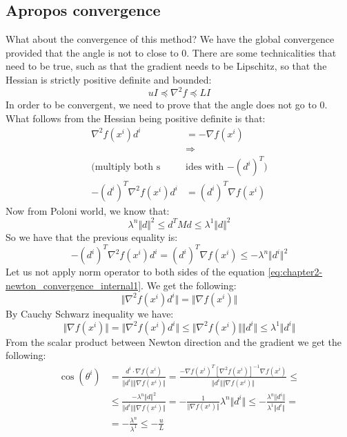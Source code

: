 \subsection{Apropos convergence}
\par What about the convergence of this method? We have the global convergence provided that the angle is not to close to 0. There are some technicalities that need to be true, such as that the gradient needs to be Lipschitz, so that the Hessian is strictly positive definite and bounded:
\begin{equation}
    u I \preceq \nabla^2 f \preceq L I
\end{equation}
In order to be convergent, we need to prove that the angle does not go to 0. What follows from the Hessian being positive definite is that:
\begin{align}
    \nabla^2 f(x^i) d^i &= - \nabla f(x^i) \label{eq:chapter2-newton_convergence_internal1}\\
    & \Rightarrow\\
    \mbox{(multiply both s}&\mbox{ides with $-(d^i)^T$)}\\
    - (d^i)^T \nabla^2 f(x^i) d^i &= (d^i)^T \nabla f(x^i)
\end{align}
Now from Poloni world, we know that:
\begin{equation}
    \lambda^n \Vert d \Vert^2 \leq d^T M d \leq \lambda^1 \Vert d \Vert^2
\end{equation}
So we have that the previous equality is:
\begin{equation}
    - (d^i)^T \nabla^2 f(x^i) d^i = (d^i)^T \nabla f(x^i) \leq - \lambda^n \Vert d^i \Vert^2
\end{equation}
Let us not apply norm operator to both sides of the equation \ref{eq:chapter2-newton_convergence_internal1}. We get the following:
\begin{equation}
    \Vert \nabla^2 f(x^i) d^i \Vert = \Vert \nabla f(x^i) \Vert
\end{equation}
By Cauchy Schwarz inequality we have:
\begin{equation}
    \Vert \nabla f(x^i) \Vert = \Vert \nabla^2 f(x^i) d^i \Vert \leq \Vert \nabla^2 f(x^i) \Vert \Vert d^i \Vert \leq \lambda^1 \Vert d^i \Vert
\end{equation}
From the scalar product between Newton direction and the gradient we get the following:
\begin{align}
    \cos (\theta^i) &= \frac{d^i \cdot \nabla f(x^i)}{\Vert d^i \Vert \Vert \nabla f(x^i) \Vert} = \frac{-\nabla f(x^i)^T [\nabla^2 f(x^i)]^{-1} \nabla f(x^i)}{\Vert d^i \Vert \Vert \nabla f(x^i) \Vert} \leq\\
    &\leq \frac{-\lambda^n \Vert d \Vert^2}{\Vert d^i \Vert \Vert \nabla f(x^i) \Vert} = -\frac{1}{\Vert \nabla f(x^i) \Vert} \lambda^n \Vert d^i \Vert \leq - \frac{\lambda^n \Vert d^i \Vert}{\lambda^1 \Vert d^i \Vert} =\\
    &= - \frac{\lambda^n}{\lambda^1} \leq - \frac{u}{L}
\end{align}
